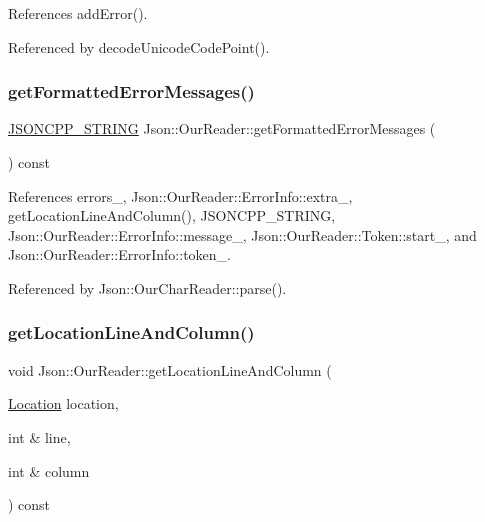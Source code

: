 References add\+Error().



Referenced by decode\+Unicode\+Code\+Point().

\mbox{\label{classJson_1_1OurReader_a7971de51d73bb4aee5b0c4742c4aaaac_a7971de51d73bb4aee5b0c4742c4aaaac}} 
\subsubsection{\texorpdfstring{get\+Formatted\+Error\+Messages()}{getFormattedErrorMessages()}}
{\footnotesize\ttfamily \hyperlink{json_8h_a1e723f95759de062585bc4a8fd3fa4be_a1e723f95759de062585bc4a8fd3fa4be}{J\+S\+O\+N\+C\+P\+P\+\_\+\+S\+T\+R\+I\+NG} Json\+::\+Our\+Reader\+::get\+Formatted\+Error\+Messages (\begin{DoxyParamCaption}{ }\end{DoxyParamCaption}) const}



References errors\+\_\+, Json\+::\+Our\+Reader\+::\+Error\+Info\+::extra\+\_\+, get\+Location\+Line\+And\+Column(), J\+S\+O\+N\+C\+P\+P\+\_\+\+S\+T\+R\+I\+NG, Json\+::\+Our\+Reader\+::\+Error\+Info\+::message\+\_\+, Json\+::\+Our\+Reader\+::\+Token\+::start\+\_\+, and Json\+::\+Our\+Reader\+::\+Error\+Info\+::token\+\_\+.



Referenced by Json\+::\+Our\+Char\+Reader\+::parse().

\mbox{\label{classJson_1_1OurReader_af482c8e718615646e13a996292e18d74_af482c8e718615646e13a996292e18d74}} 
\subsubsection{\texorpdfstring{get\+Location\+Line\+And\+Column()}{getLocationLineAndColumn()}\hspace{0.1cm}{\footnotesize\ttfamily [1/2]}}
{\footnotesize\ttfamily void Json\+::\+Our\+Reader\+::get\+Location\+Line\+And\+Column (\begin{DoxyParamCaption}\item[{\hyperlink{classJson_1_1OurReader_a1bdc7bbc52ba87cae6b19746f2ee0189_a1bdc7bbc52ba87cae6b19746f2ee0189}{Location}}]{location,  }\item[{int \&}]{line,  }\item[{int \&}]{column }\end{DoxyParamCaption}) const\hspace{0.3cm}{\ttfamily [private]}}



